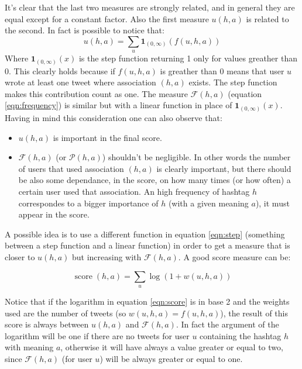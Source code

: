 \documentclass[a4paper,11pt,oneside]{article}
\DeclareMathOperator{\score}{score}
\begin{document}
It's clear that the last two measures are strongly related, and in general they are equal except for a constant factor. Also the first measure $u(h,a)$ is related to the second. In fact is possible to notice that:
\begin{equation}
\label{eqn:step}
u(h,a) = \sum_{u} \boldsymbol{1}_{(0,\infty)}\left( f(u,h,a) \right)
\end{equation}
Where $ \boldsymbol{1}_{(0,\infty)}(x) $ is the step function returning 1 only for values greather than 0. This clearly holds because if $ f(u,h,a) $ is greather than 0 means that user $u$ wrote at least one tweet where association $ (h,a) $ exists. The step function makes this contribution count as one.
The measure $\mathcal{F}(h,a)$ (equation \ref{eqn:frequency}) is similar but with a linear function in place of $\boldsymbol{1}_{(0,\infty)}(x)$.
Having in mind this consideration one can also observe that: %

\begin{itemize}
\item $u(h,a)$ is important in the final score.
\item $\mathcal{F}(h,a)$ (or $\mathcal{P}(h,a)$) shouldn't be negligible. In other words the number of users that used association $(h,a)$ is clearly important, but there should be also some dependance, in the score, on how many times (or how often) a certain user used that association.
An high frequency of hashtag $h$ correspondes to a bigger importance of $h$ (with a given meaning $a$), it must appear in the score.
\end{itemize}

A possible idea is to use a different function in equation \ref{eqn:step} (something between a step function and a linear function) in order to get a measure that is closer to $ u(h,a) $ but increasing with $ \mathcal{F}(h,a) $. A good score measure can be:

\begin{equation}
\label{eqn:score}
\score (h,a) = \sum_{u} \log \left( 1 + w(u,h,a) \right) 
\end{equation}

Notice that if the logarithm in equation \ref{eqn:score} is in base 2 and the weights used are the number of tweets (so $w(u,h,a) = f(u,h,a)$), the result of this score is always between $u(h,a)$ and $\mathcal{F}(h,a)$.
In fact the argument of the logarithm will be one if there are no tweets for user $u$ containing the hashtag $h$ with meaning $a$, otherwise it will have always a value greater or equal to two, since $\mathcal{F}(h,a)$ (for user $u$) will be always greater or equal to one.
\end{document}
